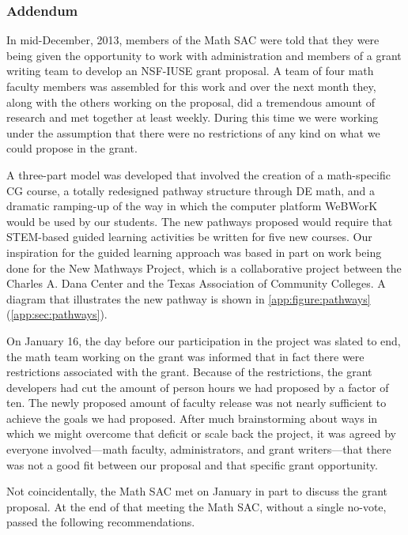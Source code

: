 \subsubsection{Addendum}\label{over:subsub:nsfiuse}
In mid-December, 2013, members of the Math SAC were told that they were being given the opportunity to work with administration and members of a grant writing team to develop an NSF-IUSE grant proposal.
A team of four math faculty members was assembled for this work and over the next month they, along with the others working on the proposal, did a tremendous amount of research and met together at least weekly.
During this time we were working under the assumption that there were no restrictions of any kind on what we could propose in the grant.

A three-part model was developed that involved the creation of a math-specific CG course, a totally redesigned pathway structure through DE math, and a dramatic ramping-up of the way in which the computer platform WeBWorK would be used by our students.
The new pathways proposed would require that STEM-based guided learning activities be written for five new courses.
Our inspiration for the guided learning approach was based in part on work being done for the New Mathways Project,  which is a collaborative project between the Charles A.
Dana Center and the Texas Association of Community Colleges.
A diagram that illustrates the new pathway is shown in \cref{app:figure:pathways} (\vref{app:sec:pathways}).

On January 16, the day before our participation in the project was slated to end, the math team working on the grant was informed that in fact there were restrictions associated with the grant.
Because of the restrictions, the grant developers had cut the amount of person hours we had proposed by a factor of ten.
The newly proposed amount of faculty release was not nearly sufficient to achieve the goals we had proposed.
After much brainstorming about ways in which we might overcome that deficit or scale back the project, it was agreed by everyone involved---math faculty, administrators, and grant writers---that there was not a good fit between our proposal and that specific grant opportunity.

Not coincidentally, the Math SAC met on January  in part to discuss the grant proposal.
At the end of that meeting the Math SAC, without a single no-vote, passed the following recommendations.


